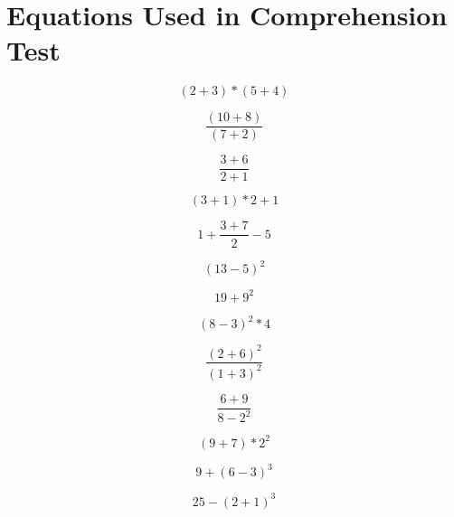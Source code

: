 \documentclass{article}
\begin{document}



\appendix
\section{Equations Used in Comprehension Test}
\label{appendix:eq_comp}

\begin{equation}
(2+3)*(5+4)
\end{equation}

\begin{equation}
\frac{(10+8)}{(7+2)}
\end{equation}

\begin{equation}
\frac{3+6}{2+1}
\end{equation}

\begin{equation}
(3+1)*2+1
\end{equation}

\begin{equation}
1+\frac{3+7}{2}-5
\end{equation}

\begin{equation}
(13-5)^2
\end{equation}

\begin{equation}
19+9^2
\end{equation}

\begin{equation}
(8-3)^2*4
\end{equation}

\begin{equation}
\frac{(2+6)^2}{(1+3)^2}
\end{equation}

\begin{equation}
\frac{6+9}{8-2^2}
\end{equation}

\begin{equation}
(9+7)*2^2
\end{equation}

\begin{equation}
9+(6-3)^3
\end{equation}

\begin{equation}
25-(2+1)^3
\end{equation}
\end{document}
